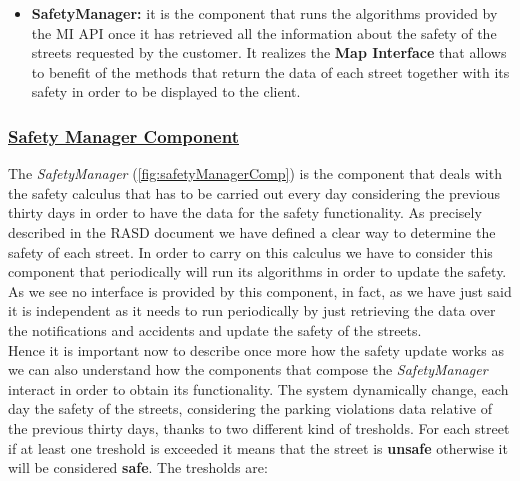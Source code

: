 			\begin{itemize}
				\item \textbf{SafetyManager:} it is the component that runs the algorithms provided by the MI API once it has retrieved all the information about the safety of the streets requested by the customer. It realizes the \textbf{Map Interface} that allows to benefit of the methods that return the data of each street together with its safety in order to be displayed to the client.
			\end{itemize}
		
		\subsubsection[Safety Manager Component]{\hyperlink{toc}{Safety Manager Component}}
			\label{sec:safetyManagerComponent}
			
			The \emph{SafetyManager} (\autoref{fig:safetyManagerComp}) is the component that deals with the safety calculus that has to be carried out every day considering the previous thirty days in order to have the data for the safety functionality. As precisely described in the RASD document \cite{RASD} we have defined a clear way to determine the safety of each street. In order to carry on this calculus we have to consider this component that periodically will run its algorithms in order to update the safety.\\
			
			As we see no interface is provided by this component, in fact, as we have just said it is independent as it needs to run periodically by just retrieving the data over the notifications and accidents and update the safety of the streets.\\
			
			Hence it is important now to describe once more how the safety update works as we can also understand how the components that compose the \emph{SafetyManager} interact in order to obtain its functionality. The system dynamically change, each day the safety of the streets, considering the parking violations data relative of the previous thirty days, thanks to two different kind of tresholds. For each street if at least one treshold is exceeded it means that the street is \textbf{unsafe} otherwise it will be considered \textbf{safe}. The tresholds are:
			
